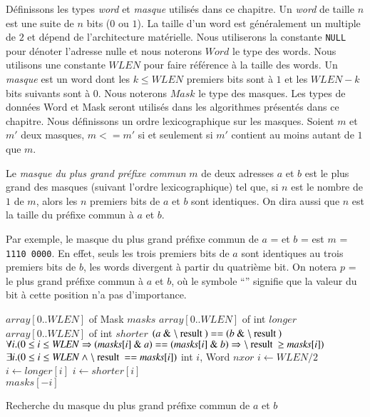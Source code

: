 Définissons les types {\em word} et {\em masque} utilisés dans ce chapitre.
Un {\em word} de taille $n$ est une suite de $n$ bits ($0$ ou $1$).
La taille d'un word est généralement un multiple de $2$ et dépend de
l'architecture matérielle.
Nous utiliserons la constante \lstinline'NULL' pour dénoter l'adresse
nulle et nous noterons $Word$ le type des words.
Nous utilisons une constante $WLEN$ pour faire référence à la taille des words.
Un {\em masque} est un word dont les $k \le WLEN$ premiers bits sont à $1$ et
les $WLEN-k$ bits suivants sont à $0$.
Nous noterons $Mask$ le type des masques.
Les types de données Word et Mask seront utilisés dans les algorithmes présentés
dans ce chapitre.
Nous définissons un ordre lexicographique sur les masques.
Soient $m$ et $m'$ deux masques, $m <= m'$ si et seulement si $m'$ contient au
moins autant de $1$ que $m$.

Le {\em masque du plus grand préfixe commun} $m$ de deux adresses $a$ et $b$ est
le plus grand des masques (suivant l'ordre lexicographique) tel que, si $n$ est
le nombre de $1$ de $m$, alors les $n$ premiers bits de $a$ et $b$ sont
identiques.
On dira aussi que $n$ est la taille du préfixe commun à $a$ et $b$.

Par exemple, le masque du plus grand préfixe commun de $a$ =
 et $b$ =  est
$m$ = \texttt{1110\,0000}.
En effet, seuls les trois premiers bits de $a$ sont identiques au trois premiers
bits de $b$, les words divergent à partir du quatrième bit.
On notera $p$ =  le plus grand préfixe commun à $a$
et $b$, où le symbole ``{\tt *}'' signifie que la valeur du bit à cette position
n'a pas d'importance.


\begin{algorithm}
\begin{algorithmic}[1]
\Statex $array[ 0 .. \mathit{WLEN} ]$ of Mask $\mathit{masks}$
\Statex $array[ 0 .. \mathit{WLEN} ]$ of int $\mathit{longer}$
\Statex $array[ 0 .. \mathit{WLEN} ]$ of int $\mathit{shorter}$
\Statex
\Ensure $(a \Band \mresult) == (b \Band \mresult)$
\Ensure $\forall i. (0 \le i \le \mathit{WLEN} \Rightarrow (\mathit{masks}[i] \Band a) == (\mathit{masks}[i] \Band b) \Rightarrow \mresult \ge \mathit{masks}[i])$
\Ensure $\exists i. (0 \le i \le \mathit{WLEN} \land \mresult == \mathit{masks}[i])$
\Statex
{}
\State int $i$, Word $nxor$
\State $i \gets \mathit{WLEN}/2$
    \State $i \gets \mathit{longer}[i]$ 
  \Else
    \State $i \gets \mathit{shorter}[i]$
  \EndIf
\EndWhile\\
\Return $masks[-i]$
\EndFunction
\end{algorithmic}
\caption{Recherche du masque du plus grand préfixe commun de $a$ et $b$
  \label{algo:prefix}}
\end{algorithm}


